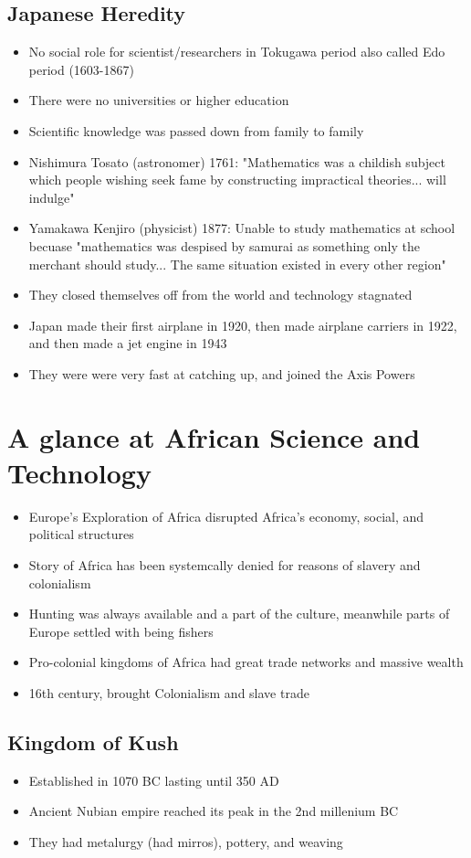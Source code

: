 \documentclass{article}
\begin{document}
\subsection{Japanese Heredity}
\begin{itemize}
  \item No social role for scientist/researchers in Tokugawa
    period also called Edo period (1603-1867)
  \item There were no universities or higher education
  \item Scientific knowledge was passed down from family to family
\item Nishimura Tosato (astronomer) 1761: "Mathematics was a childish subject
  which people wishing seek fame by constructing impractical theories... will indulge"
\item Yamakawa Kenjiro (physicist) 1877: Unable to study mathematics at school
  becuase "mathematics was despised by samurai as something
  only the merchant should study... The same situation existed in every other region"
\item They closed themselves off from the world and technology stagnated
\item Japan made their first airplane in 1920, then made airplane carriers
  in 1922, and then made a jet engine in 1943
\item They were were very fast at catching up, and joined
  the Axis Powers
\end{itemize}

\section{A glance at African Science and Technology}
\begin{itemize}
  \item Europe's Exploration of Africa disrupted Africa's economy, social, and
    political structures
  \item Story of Africa has been systemcally denied for reasons of slavery and colonialism
  \item Hunting was always available and a part of the culture,
    meanwhile parts of Europe settled with being fishers
  \item Pro-colonial kingdoms of Africa had great trade networks and
    massive wealth
  \item 16th century, brought Colonialism and slave trade
\end{itemize}

\subsection{Kingdom of Kush}
\begin{itemize}
  \item Established in 1070 BC lasting until 350 AD
  \item Ancient Nubian empire reached its peak in the 2nd millenium BC
  \item They had metalurgy (had mirros), pottery, and weaving
\end{itemize}
\end{document}
